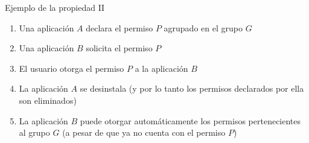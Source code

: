 \documentclass[pdf, handout]{beamer} %
\begin{document}
\begin{frame}{Ejemplo de la propiedad II}
    \begin{enumerate}[<+->]
        \item Una aplicación $A$ declara el permiso $P$ agrupado en el grupo $G$
        \item Una aplicación $B$ solicita el permiso $P$
        \item El usuario otorga el permiso $P$ a la aplicación $B$
        \item La aplicación $A$ se desinstala (y por lo tanto los permisos declarados por ella son
              eliminados)
        \item La aplicación $B$ puede otorgar automáticamente los permisos pertenecientes al grupo $G$
              (a pesar de que ya no cuenta con el permiso $P$)
    \end{enumerate}
\end{frame}
\end{document}
